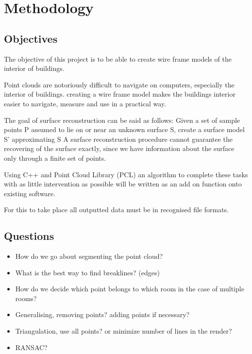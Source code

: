 



\section{Methodology}

\subsection{Objectives}

The objective of this project is to be able to create wire frame models of the interior of buildings.

Point clouds are notoriously difficult to navigate on computers, especially the interior of buildings. creating a wire frame model makes the buildings interior easier to navigate, measure and use in a practical way.

The goal of surface reconstruction can be said as follows: Given a set of sample points P assumed to lie on or near an unknown surface S, create a surface model S' approximating S
A surface reconstruction procedure cannot guarantee the recovering of the surface exactly, since we have information about the surface only through a finite set of points.

Using C++ and Point Cloud Library (PCL) an algorithm to complete these tasks with as little intervention as possible will be written as an add on function onto existing software.

For this to take place all outputted data must be in recognised file formats.


\subsection{Questions}
\begin{itemize}

\item How do we go about segmenting the point cloud?

\item What is the best way to find breaklines? (edges)

\item How do we decide which point belongs to which room in the case of multiple rooms?

\item Generalising, removing points? adding points if necessary?

\item Triangulation, use all points? or minimize number of lines in the render?

\item RANSAC?

\end{itemize}


